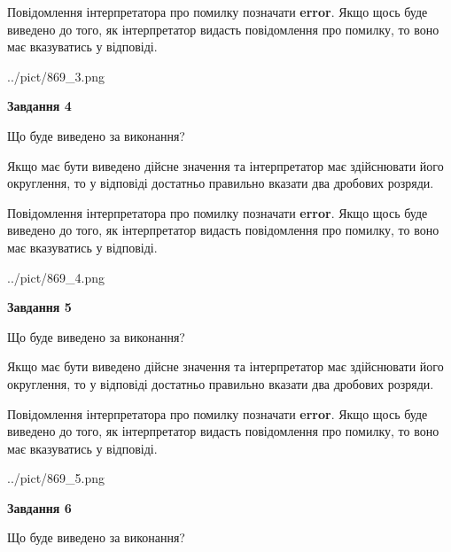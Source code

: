 \documentclass[12pt, ukrainian]{article}
\begin{document}
{\begin {Large}
Повідомлення інтерпретатора про помилку позначати \textbf{error}.
Якщо щось буде виведено до того, як інтерпретатор видасть повідомлення про помилку, 
то воно має вказуватись у відповіді. \par

\begin{center}
	{../pict/869_3.png}
\end{center}
\newpage

{\begin {center}\textbf{Завдання 4}\end {center}}\par
Що буде виведено за виконання? \par

Якщо має бути виведено дійсне значення та інтерпретатор має здійснювати його округлення, 
то у відповіді достатньо правильно вказати два дробових розряди.

Повідомлення інтерпретатора про помилку позначати \textbf{error}.
Якщо щось буде виведено до того, як інтерпретатор видасть повідомлення про помилку, 
то воно має вказуватись у відповіді. \par

\begin{center}
	{../pict/869_4.png}
\end{center}
\newpage

{\begin {center}\textbf{Завдання 5}\end {center}}\par
Що буде виведено за виконання? \par

Якщо має бути виведено дійсне значення та інтерпретатор має здійснювати його округлення, 
то у відповіді достатньо правильно вказати два дробових розряди.

Повідомлення інтерпретатора про помилку позначати \textbf{error}.
Якщо щось буде виведено до того, як інтерпретатор видасть повідомлення про помилку, 
то воно має вказуватись у відповіді. \par

\begin{center}
	{../pict/869_5.png}
\end{center}
\newpage

{\begin {center}\textbf{Завдання 6}\end {center}}\par
Що буде виведено за виконання? \par


\end{Large}}
\end{document}
